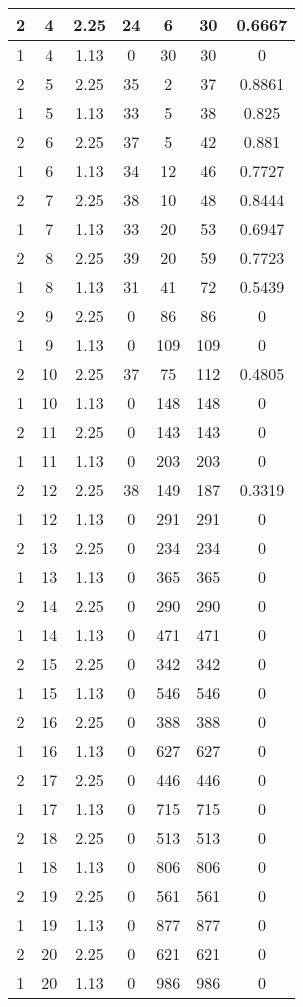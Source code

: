 \documentclass[letterpaper, 12pt]{article}
\begin{document}
\begin{longtable}{|c|c|c|c|c|c|c|}
\hline
2 & 4 & 2.25 & 24 & 6 & 30 & 0.6667 \\
\hline
1 & 4 & 1.13 & 0 & 30 & 30 & 0 \\
\hline
2 & 5 & 2.25 & 35 & 2 & 37 & 0.8861 \\
\hline
1 & 5 & 1.13 & 33 & 5 & 38 & 0.825 \\
\hline
2 & 6 & 2.25 & 37 & 5 & 42 & 0.881 \\
\hline
1 & 6 & 1.13 & 34 & 12 & 46 & 0.7727 \\
\hline
2 & 7 & 2.25 & 38 & 10 & 48 & 0.8444 \\
\hline
1 & 7 & 1.13 & 33 & 20 & 53 & 0.6947 \\
\hline
2 & 8 & 2.25 & 39 & 20 & 59 & 0.7723 \\
\hline
1 & 8 & 1.13 & 31 & 41 & 72 & 0.5439 \\
\hline
2 & 9 & 2.25 & 0 & 86 & 86 & 0 \\
\hline
1 & 9 & 1.13 & 0 & 109 & 109 & 0 \\
\hline
2 & 10 & 2.25 & 37 & 75 & 112 & 0.4805 \\
\hline
1 & 10 & 1.13 & 0 & 148 & 148 & 0 \\
\hline
2 & 11 & 2.25 & 0 & 143 & 143 & 0 \\
\hline
1 & 11 & 1.13 & 0 & 203 & 203 & 0 \\
\hline
2 & 12 & 2.25 & 38 & 149 & 187 & 0.3319 \\
\hline
1 & 12 & 1.13 & 0 & 291 & 291 & 0 \\
\hline
2 & 13 & 2.25 & 0 & 234 & 234 & 0 \\
\hline
1 & 13 & 1.13 & 0 & 365 & 365 & 0 \\
\hline
2 & 14 & 2.25 & 0 & 290 & 290 & 0 \\
\hline
1 & 14 & 1.13 & 0 & 471 & 471 & 0 \\
\hline
2 & 15 & 2.25 & 0 & 342 & 342 & 0 \\
\hline
1 & 15 & 1.13 & 0 & 546 & 546 & 0 \\
\hline
2 & 16 & 2.25 & 0 & 388 & 388 & 0 \\
\hline
1 & 16 & 1.13 & 0 & 627 & 627 & 0 \\
\hline
2 & 17 & 2.25 & 0 & 446 & 446 & 0 \\
\hline
1 & 17 & 1.13 & 0 & 715 & 715 & 0 \\
\hline
2 & 18 & 2.25 & 0 & 513 & 513 & 0 \\
\hline
1 & 18 & 1.13 & 0 & 806 & 806 & 0 \\
\hline
2 & 19 & 2.25 & 0 & 561 & 561 & 0 \\
\hline
1 & 19 & 1.13 & 0 & 877 & 877 & 0 \\
\hline
2 & 20 & 2.25 & 0 & 621 & 621 & 0 \\
\hline
1 & 20 & 1.13 & 0 & 986 & 986 & 0 \\
\hline
\end{longtable}
\end{document}
